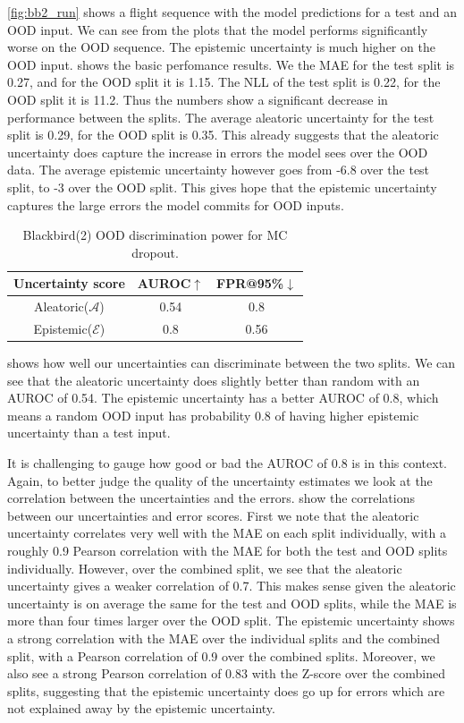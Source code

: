 \cref{fig:bb2_run} shows a flight sequence with the model predictions for a test and an OOD input. We can see from the plots that the model performs significantly worse on the OOD sequence. The epistemic uncertainty is much higher on the OOD input.  shows the basic perfomance results. We the MAE for the test split is 0.27, and for the OOD split it is 1.15. The NLL of the test split is 0.22, for the OOD split it is 11.2. Thus the numbers show a significant decrease in performance between the splits. The average aleatoric uncertainty for the test split is 0.29, for the OOD split is 0.35. This already suggests that the aleatoric uncertainty does capture the increase in errors the model sees over the OOD data. The average epistemic uncertainty however goes from -6.8 over the test split, to -3 over the OOD split. This gives hope that the epistemic uncertainty captures the large errors the model commits for OOD inputs. 

\begin{table}[h]
\centering
    \begin{tabular}{c  c  c}  
        \toprule
        Uncertainty score & AUROC$\uparrow$ & FPR@95\%$\downarrow$\\
        \midrule
        Aleatoric($\mathcal{A}$) & 0.54  & 0.8\\
        Epistemic($\mathcal{E}$) & 0.8 &  0.56 \\
        \midrule
    \end{tabular}
    \caption{Blackbird(2) OOD discrimination power for MC dropout.}
    \label{tbl:bb2_discrimination}
\end{table}

 shows how well our uncertainties can discriminate between the two splits. We can see that the aleatoric uncertainty does slightly better than random with an AUROC of 0.54. The epistemic uncertainty has a better AUROC of 0.8, which means a random OOD input has probability 0.8 of having higher epistemic uncertainty than a test input. 

It is challenging to gauge how good or bad the AUROC of 0.8 is in this context. Again, to better judge the quality of the uncertainty estimates we look at the correlation between the uncertainties and the errors.  show the correlations between our uncertainties and error scores. First we note that the aleatoric uncertainty correlates very well with the MAE on each split individually, with a roughly 0.9 Pearson correlation with the MAE for both the test and OOD splits individually. However, over the combined split, we see that the aleatoric uncertainty gives a weaker correlation of 0.7. This makes sense given the aleatoric uncertainty is on average the same for the test and OOD splits, while the MAE is more than four times larger over the OOD split. The epistemic uncertainty shows a strong correlation with the MAE over the individual splits and the combined split, with a Pearson correlation of 0.9 over the combined splits. Moreover, we also see a strong Pearson correlation of 0.83 with the Z-score over the combined splits, suggesting that the epistemic uncertainty does go up for errors which are not explained away by the epistemic uncertainty. 


